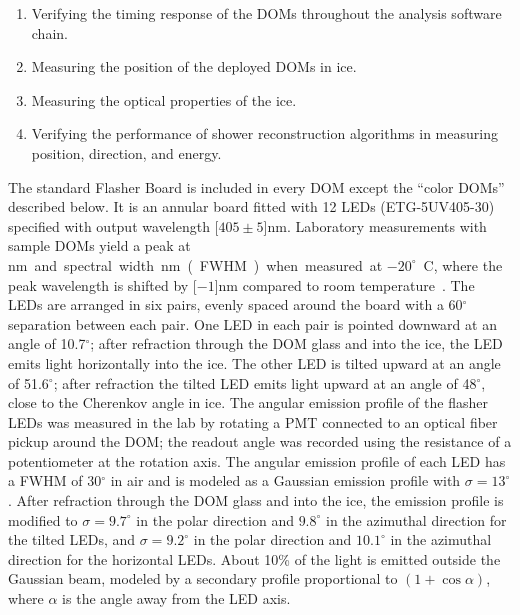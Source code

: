 \begin{enumerate}
\item Verifying the timing response of the DOMs throughout the analysis
  software chain.
\item Measuring the position of the deployed DOMs in ice.
\item Measuring the optical properties of the ice.
\item Verifying the performance of shower reconstruction algorithms
  in measuring position, direction, and energy.
\end{enumerate}

The standard Flasher Board is
included in every DOM except the ``color DOMs''
described below. It is an annular board fitted with 12 LEDs (ETG-5UV405-30)
specified with output wavelength \unit[$405\pm5$]nm.  Laboratory
measurements with sample DOMs yield a peak at
\unit[399]nm and spectral width \unit[14]nm (FWHM) when measured at
$-20^{\circ}$~C, where the peak wavelength is shifted by 
\unit[$-1$]nm compared to room temperature~\cite{Aartsen:2013rt}.
The LEDs are arranged in six pairs, evenly spaced around the board
with a 60$^{\circ}$ separation between each pair. One LED in each pair
is pointed downward at an angle of 10.7$^{\circ}$; after refraction through the DOM glass and into
the ice, the LED
emits light horizontally into the ice. The other LED is tilted upward
at an angle of 51.6$^{\circ}$; after refraction the tilted LED
emits light upward at an angle 
of 48$^{\circ}$, close to the Cherenkov angle in ice. The angular
emission profile of the flasher LEDs was measured in the lab by
rotating a PMT connected to an
optical fiber pickup around the DOM; the readout angle was recorded
using the resistance of a potentiometer at the rotation axis.
The angular emission profile of each LED has a FWHM of
30$^{\circ}$ in air and is modeled as a Gaussian emission profile
with $\sigma = 13^{\circ}$. After refraction through the DOM glass and into
the ice, the emission profile is modified to $\sigma = 9.7^{\circ}$ in the polar direction
and $9.8^{\circ}$ in the azimuthal direction for the tilted LEDs, and $\sigma=9.2^{\circ}$ in the polar direction
and $10.1^{\circ}$ in the azimuthal direction for the horizontal LEDs.
About 10\% of the light is emitted outside the Gaussian beam, modeled by
a secondary profile proportional to $(1+\cos{\alpha})$, where $\alpha$ is the angle
away from the LED axis.

